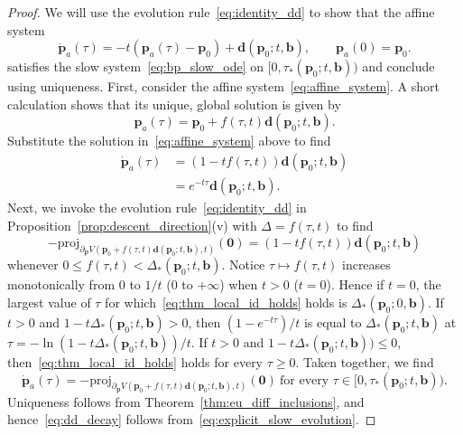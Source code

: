 \documentclass[11pt]{article}
\numberwithin{prop}{section}
\numberwithin{lem}{section}
\numberwithin{rem}{section}
\numberwithin{cor}{section}
\numberwithin{thm}{section}
\numberwithin{defn}{section}
\numberwithin{fact}{section}
\theoremstyle{plain}
\def\bb {\boldsymbol{b}}
\def\bd {\boldsymbol{d}}
\def\bp {\boldsymbol{p}}
\def\proj {\mathrm{proj}}
\def\bpo {\bp_{0}}
\def\bpa {\bp_{a}}
\begin{document}
\begin{proof}
We will use the evolution rule~\eqref{eq:identity_dd} to show that the affine system
\begin{equation}\label{eq:affine_system}
    \dot{\bp}_{a}(\tau) =-t(\bpa(\tau) - \bpo) + \bd(\bpo;t,\bb), \qquad \bpa(0) = \bpo.
\end{equation}
satisfies the slow system~\eqref{eq:bp_slow_ode} on $[0,\tau_{*}(\bpo;t,\bb))$ and conclude using uniqueness. First, consider the affine system~\eqref{eq:affine_system}. A short calculation shows that its unique, global solution is given by 
\[
\bpa(\tau) = \bpo + f(\tau,t)\bd(\bpo;t,\bb).
\]
Substitute the solution in~\eqref{eq:affine_system} above to find
\begin{equation}\label{eq:explicit_slow_evolution}
\begin{alignedat}{1}
\dot{\bp}_{a}(\tau) &= (1-tf(\tau,t))\bd(\bpo;t,\bb) \\
&= e^{-t\tau}\bd(\bpo;t,\bb).
\end{alignedat}
\end{equation}
Next, we invoke the evolution rule~\eqref{eq:identity_dd} in Proposition~\ref{prop:descent_direction}(v) with $\Delta = f(\tau,t)$ to find
\begin{equation}\label{eq:thm_local_id_holds}
-\proj_{\partial_{\bp} V(\bpo + f(\tau,t)\bd(\bpo;t,\bb),t)}(\boldsymbol{0}) = (1-tf(\tau,t))\bd(\bpo;t,\bb)
\end{equation}
whenever $0 \leqslant f(\tau,t) < \Delta_{*}(\bpo;t,\bb)$. Notice $\tau \mapsto f(\tau,t)$ increases monotonically from $0$ to $1/t$ (0 to $+\infty$) when $t > 0$ ($t = 0$). Hence if $t = 0$, the largest value of $\tau$ for which~\eqref{eq:thm_local_id_holds} holds is $\Delta_{*}(\bpo;0,\bb)$. If $t > 0$ and $1-t\Delta_{*}(\bpo;t,\bb) > 0$, then $(1-e^{-t\tau})/t$ is equal to $\Delta_{*}(\bpo;t,\bb)$ at $\tau = -\ln\left(1-t\Delta_{*}(\bpo;t,\bb)\right)/t$. If $t > 0$ and $1 - t\Delta_{*}(\bpo;t,\bb)) \leqslant 0$, then~\eqref{eq:thm_local_id_holds} holds for every $\tau \geqslant 0$. Taken together, we find 
\[
\dot{\bp}_{a}(\tau) = -\proj_{\partial_{\bp} V(\bpo + f(\tau,t)\bd(\bpo;t,\bb),t)}(\boldsymbol{0}) \ \text{for every $\tau \in [0,\tau_{*}(\bpo;t,\bb))$}.
\]
Uniqueness follows from Theorem~\ref{thm:eu_diff_inclusions}, and hence~\eqref{eq:dd_decay} follows from~\eqref{eq:explicit_slow_evolution}.
\end{proof}



\end{document}
